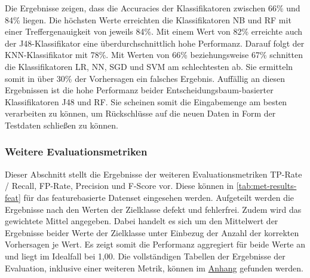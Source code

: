 Die Ergebnisse zeigen, dass die Accuracies der Klassifikatoren zwischen 66\% und 84\% liegen. Die höchsten Werte erreichten die Klassifikatoren NB und RF mit einer Treffergenauigkeit von jeweils 84\%. Mit einem Wert von 82\% erreichte auch der J48-Klassifikator eine überdurchschnittlich hohe Performanz. Darauf folgt der KNN-Klassifikator mit 78\%. Mit Werten von 66\% beziehungsweise 67\% schnitten die Klassifikatoren LR, NN, SGD und SVM am schlechtesten ab. Sie ermitteln somit in über 30\% der Vorhersagen ein falsches Ergebnis. Auffällig an diesen Ergebnissen ist die hohe Performanz beider Entscheidungsbaum-basierter Klassifikatoren J48 und RF. Sie scheinen somit die Eingabemenge am besten verarbeiten zu können, um Rückschlüsse auf die neuen Daten in Form der Testdaten schließen zu können.

\subsubsection*{Weitere Evaluationsmetriken}

Dieser Abschnitt stellt die Ergebnisse der weiteren Evaluationsmetriken TP-Rate / Recall, FP-Rate, Precision und F-Score vor. Diese können in \autoref{tab:met-results-feat} für das featurebasierte Datenset eingesehen werden. Aufgeteilt werden die Ergebnisse nach den Werten der Zielklasse \glqq defekt\grqq{} und \glqq fehlerfrei\grqq. Zudem wird das gewichtete Mittel angegeben. Dabei handelt es sich um den Mittelwert der Ergebnisse beider Werte der Zielklasse unter Einbezug der Anzahl der korrekten Vorhersagen je Wert. Es zeigt somit die Performanz aggregiert für beide Werte an und liegt im Idealfall bei 1,00. Die vollständigen Tabellen der Ergebnisse der Evaluation, inklusive einer weiteren Metrik, können im \hyperref[appendix3]{Anhang} gefunden werden.

